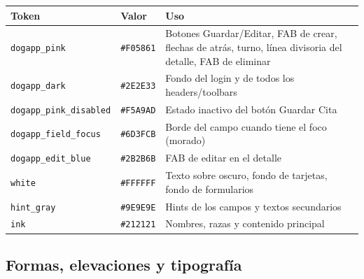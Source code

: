 \documentclass[11pt,letterpaper]{article}
\newcommand{\hex}[1]{\texttt{\##1}}
\newcommand{\code}[1]{\texttt{\small #1}}
\begin{document}
\begin{center}
\small
\begin{xltabular}{\linewidth}{@{}l l X@{}}
\toprule
\textbf{Token} & \textbf{Valor} & \textbf{Uso}\\
\midrule
\endhead
\bottomrule
\endlastfoot
\code{dogapp\_pink} & \hex{F05861} & Botones Guardar/Editar, FAB de crear, flechas de atr\'as, turno, l\'inea divisoria del detalle, FAB de eliminar\\
\code{dogapp\_dark} & \hex{2E2E33} & Fondo del login y de todos los headers/toolbars\\
\code{dogapp\_pink\_disabled} & \hex{F5A9AD} & Estado inactivo del bot\'on Guardar Cita\\
\code{dogapp\_field\_focus} & \hex{6D3FCB} & Borde del campo cuando tiene el foco (morado)\\
\code{dogapp\_edit\_blue} & \hex{2B2B6B} & FAB de editar en el detalle\\
\code{white} & \hex{FFFFFF} & Texto sobre oscuro, fondo de tarjetas, fondo de formularios\\
\code{hint\_gray} & \hex{9E9E9E} & Hints de los campos y textos secundarios\\
\code{ink} & \hex{212121} & Nombres, razas y contenido principal\\
\end{xltabular}
\end{center}

\subsection{Formas, elevaciones y tipograf\'ia}
\end{document}
